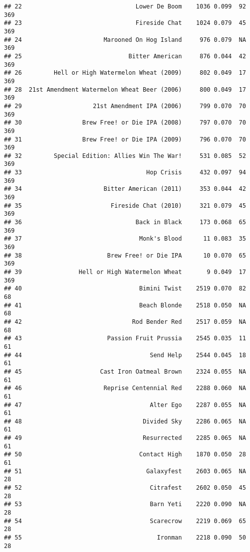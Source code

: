 \documentclass[
]{article}
\begin{document}
\begin{verbatim}
## 22                                Lower De Boom    1036 0.099  92        369
## 23                                Fireside Chat    1024 0.079  45        369
## 24                       Marooned On Hog Island     976 0.079  NA        369
## 25                              Bitter American     876 0.044  42        369
## 26         Hell or High Watermelon Wheat (2009)     802 0.049  17        369
## 28  21st Amendment Watermelon Wheat Beer (2006)     800 0.049  17        369
## 29                    21st Amendment IPA (2006)     799 0.070  70        369
## 30                 Brew Free! or Die IPA (2008)     797 0.070  70        369
## 31                 Brew Free! or Die IPA (2009)     796 0.070  70        369
## 32         Special Edition: Allies Win The War!     531 0.085  52        369
## 33                                   Hop Crisis     432 0.097  94        369
## 34                       Bitter American (2011)     353 0.044  42        369
## 35                         Fireside Chat (2010)     321 0.079  45        369
## 36                                Back in Black     173 0.068  65        369
## 37                                 Monk's Blood      11 0.083  35        369
## 38                        Brew Free! or Die IPA      10 0.070  65        369
## 39                Hell or High Watermelon Wheat       9 0.049  17        369
## 40                                 Bimini Twist    2519 0.070  82         68
## 41                                 Beach Blonde    2518 0.050  NA         68
## 42                               Rod Bender Red    2517 0.059  NA         68
## 43                        Passion Fruit Prussia    2545 0.035  11         61
## 44                                    Send Help    2544 0.045  18         61
## 45                      Cast Iron Oatmeal Brown    2324 0.055  NA         61
## 46                       Reprise Centennial Red    2288 0.060  NA         61
## 47                                    Alter Ego    2287 0.055  NA         61
## 48                                  Divided Sky    2286 0.065  NA         61
## 49                                  Resurrected    2285 0.065  NA         61
## 50                                 Contact High    1870 0.050  28         61
## 51                                   Galaxyfest    2603 0.065  NA         28
## 52                                    Citrafest    2602 0.050  45         28
## 53                                    Barn Yeti    2220 0.090  NA         28
## 54                                    Scarecrow    2219 0.069  65         28
## 55                                      Ironman    2218 0.090  50         28

\end{verbatim}
\end{document}
